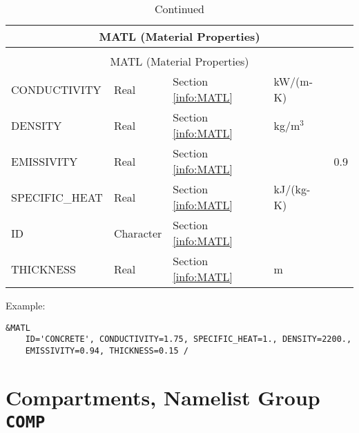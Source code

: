 \begin{longtable}{@{\extracolsep{\fill}}|l|l|l|l|l|}
\caption[Thermal Properties ({\ct MATL} namelist group)]{For more information see Section~\ref{info:MATL}.}
\label{tbl:MATL} \\
\hline
\multicolumn{5}{|c|}{{\ct MATL} (Material Properties)} \\
\hline \hline
\endfirsthead
\caption[]{Continued} \\
\hline
\multicolumn{5}{|c|}{{\ct MATL} (Material Properties)} \\
\hline \hline
\endhead
{\ct CONDUCTIVITY}        & Real 	 & Section \ref{info:MATL}                 & kW/(m-K)  &                 \\ \hline
{\ct DENSITY}             & Real 	 & Section \ref{info:MATL}                 & kg/m$^3$  &                 \\ \hline
{\ct EMISSIVITY}          & Real	 & Section \ref{info:MATL}                 &           &   0.9          \\ \hline
{\ct SPECIFIC\_HEAT}      & Real	 & Section \ref{info:MATL}                 & kJ/(kg-K) &                 \\ \hline
{\ct ID}                  & Character    & Section \ref{info:MATL}                 &           &                 \\ \hline
{\ct THICKNESS}           & Real  	 & Section \ref{info:MATL}                 & m         &                 \\ \hline
\end{longtable}

\noindent Example:
\begin{lstlisting}
&MATL
	ID='CONCRETE', CONDUCTIVITY=1.75, SPECIFIC_HEAT=1., DENSITY=2200.,
	EMISSIVITY=0.94, THICKNESS=0.15 /
\end{lstlisting}




\clearpage
\section{Compartments, Namelist Group \texorpdfstring{{\tt COMP}}{COMP}}

